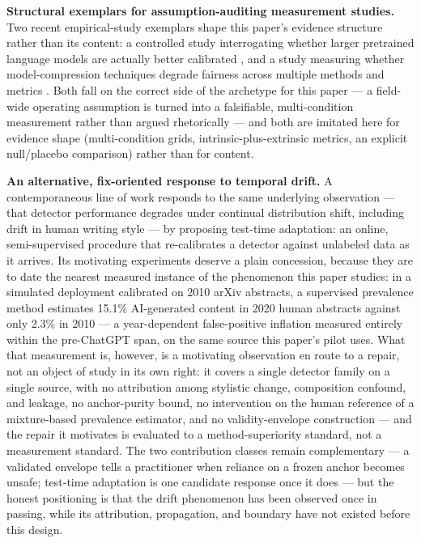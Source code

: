 \documentclass[11pt]{article}
\begin{document}
\textbf{Structural exemplars for assumption-auditing measurement studies.} Two recent empirical-study exemplars shape this paper's evidence structure rather than its content: a controlled study interrogating whether larger pretrained language models are actually better calibrated \citep{ACloseLookInto}, and a study measuring whether model-compression techniques degrade fairness across multiple methods and metrics \citep{AComparativeStudyOn}. Both fall on the correct side of the archetype for this paper --- a field-wide operating assumption is turned into a falsifiable, multi-condition measurement rather than argued rhetorically --- and both are imitated here for evidence shape (multi-condition grids, intrinsic-plus-extrinsic metrics, an explicit null/placebo comparison) rather than for content.

\textbf{An alternative, fix-oriented response to temporal drift.} A contemporaneous line of work \citep{MovingTargetTTA} responds to the same underlying observation --- that detector performance degrades under continual distribution shift, including drift in human writing style --- by proposing test-time adaptation: an online, semi-supervised procedure that re-calibrates a detector against unlabeled data as it arrives. Its motivating experiments deserve a plain concession, because they are to date the nearest measured instance of the phenomenon this paper studies: in a simulated deployment calibrated on 2010 arXiv abstracts, a supervised prevalence method estimates 15.1\% AI-generated content in 2020 human abstracts against only 2.3\% in 2010 --- a year-dependent false-positive inflation measured entirely within the pre-ChatGPT span, on the same source this paper's pilot uses. What that measurement is, however, is a motivating observation en route to a repair, not an object of study in its own right: it covers a single detector family on a single source, with no attribution among stylistic change, composition confound, and leakage, no anchor-purity bound, no intervention on the human reference of a mixture-based prevalence estimator, and no validity-envelope construction --- and the repair it motivates is evaluated to a method-superiority standard, not a measurement standard. The two contribution classes remain complementary --- a validated envelope tells a practitioner when reliance on a frozen anchor becomes unsafe; test-time adaptation is one candidate response once it does --- but the honest positioning is that the drift phenomenon has been observed once in passing, while its attribution, propagation, and boundary have not existed before this design.
\end{document}
